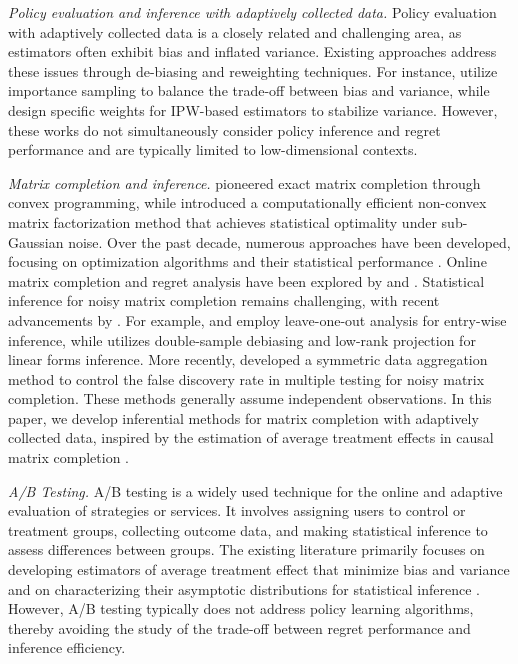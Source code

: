 \documentclass[12pt]{article}
\theoremstyle{plain}
\begin{document}

\emph{Policy evaluation and inference with adaptively collected data.}  Policy evaluation with adaptively collected data is a closely related and challenging area, as estimators often exhibit bias and inflated variance. Existing approaches address these issues through de-biasing and reweighting techniques. For instance, \citet{bottou2013counterfactual, wang2017optimal, su2020doubly} utilize importance sampling to balance the trade-off between bias and variance, while \citet{luedtke2016statistical, hadad2021confidence, zhan2021off} design specific weights for IPW-based estimators to stabilize variance. However, these works do not simultaneously consider policy inference and regret performance and are typically limited to low-dimensional contexts. 


\emph{Matrix completion and inference.} \citet{candes2010matrix} pioneered exact matrix completion through convex programming, while \citet{keshavan2010matrix} introduced a computationally efficient non-convex matrix factorization method that achieves statistical optimality under sub-Gaussian noise. Over the past decade, numerous approaches have been developed, focusing on optimization algorithms and their statistical performance \citep{koltchinskii2011nuclear, hastie2015matrix, ge2016matrix, ma2018implicit}. Online matrix completion and regret analysis have been explored by \citet{jin2016provable} and \citet{cai2023online}. Statistical inference for noisy matrix completion remains challenging, with recent advancements by \citet{chen2019inference, xia2021statistical, yan2021inference, chernozhukov2023inference}. For example, \citet{chen2019inference} and \citet{yan2021inference} employ leave-one-out analysis for entry-wise inference, while \citet{xia2021statistical} utilizes double-sample debiasing and low-rank projection for linear forms inference. More recently, \citet{ma2023multiple} developed a symmetric data aggregation method to control the false discovery rate in multiple testing for noisy matrix completion. These methods generally assume independent observations. In this paper, we develop inferential methods for matrix completion with adaptively collected data, inspired by the estimation of average treatment effects in causal matrix completion \citep{athey2021matrix, bai2021matrix, xiong2023large, choi2023matrix}. 

\emph{A/B Testing.} A/B testing is a widely used technique for the online and adaptive evaluation of strategies or services. It involves assigning users to control or treatment groups, collecting outcome data, and making statistical inference to assess differences between groups. The existing literature primarily focuses on developing estimators of average treatment effect that minimize bias and variance and on characterizing their asymptotic distributions for statistical inference \citep{tang2010overlapping, johari2017peeking, yang2017framework, kohavi2020trustworthy, shi2023dynamic, wu2024nonstationary}. However, A/B testing typically does not address policy learning algorithms, thereby avoiding the study of the trade-off between regret performance and inference efficiency.
\end{document}
